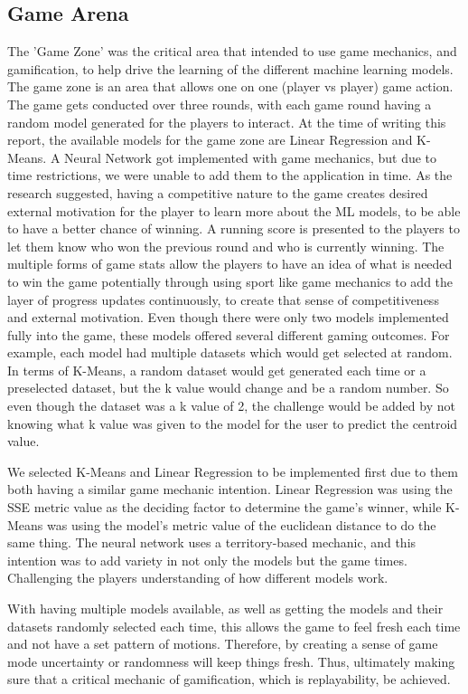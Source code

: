 		
	\subsection{Game Arena}
	
		The 'Game Zone' was the critical area that intended to use game mechanics, and gamification, to help drive the learning of the different machine learning models. The game zone is an area that allows one on one (player vs player) game action. The game gets conducted over three rounds, with each game round having a random model generated for the players to interact. At the time of writing this report, the available models for the game zone are Linear Regression and K-Means. A Neural Network got implemented with game mechanics, but due to time restrictions, we were unable to add them to the application in time. As the research suggested, having a competitive nature to the game creates desired external motivation for the player to learn more about the ML models, to be able to have a better chance of winning. A running score is presented to the players to let them know who won the previous round and who is currently winning. The multiple forms of game stats allow the players to have an idea of what is needed to win the game potentially through using sport like game mechanics to add the layer of progress updates continuously, to create that sense of competitiveness and external motivation. Even though there were only two models implemented fully into the game, these models offered several different gaming outcomes. For example, each model had multiple datasets which would get selected at random. In terms of K-Means, a random dataset would get generated each time or a preselected dataset, but the k value would change and be a random number. So even though the dataset was a k value of 2, the challenge would be added by not knowing what k value was given to the model for the user to predict the centroid value. 
		
		We selected K-Means and Linear Regression to be implemented first due to them both having a similar game mechanic intention. Linear Regression was using the SSE metric value as the deciding factor to determine the game's winner, while K-Means was using the model's metric value of the euclidean distance to do the same thing. The neural network uses a territory-based mechanic, and this intention was to add variety in not only the models but the game times. Challenging the players understanding of how different models work.
		
		With having multiple models available, as well as getting the models and their datasets randomly selected each time, this allows the game to feel fresh each time and not have a set pattern of motions. Therefore, by creating a sense of game mode uncertainty or randomness will keep things fresh. Thus, ultimately making sure that a critical mechanic of gamification, which is replayability, be achieved.  
		
